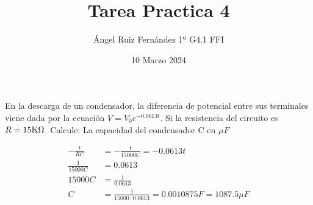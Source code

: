 \documentclass[12pt, letterpaper, twoside]{article}
\title{Tarea Practica 4}
\author{Ángel Ruiz Fernández 1º G4.1 FFI}
\date{10 Marzo 2024}
\begin{document}
	\maketitle
	
	\section{}
	En la descarga de un condensador, la diferencia de potencial entre sus	terminales viene dada por la ecuación $V = V_0 e^{-0.0613t}$. Si la resistencia del circuito es $R = 15 \si K \Omega$. Calcule: La capacidad del condensador C en $\si{\mu F}$
	
	\begin{align*}
		-\frac{t}{RC} &= -\frac{t}{15000 C} = -0.0613t \\
		\frac{1}{15000 C} &= 0.0613 \\
		15000 C &= \frac{1}{0.0613} \\
		C &= \frac{1}{15000 \cdot 0.0613} = 0.0010875 \si{F} = \boxed{ 1087.5 \si{\mu F}} \\
	\end{align*}
	
\end{document}
